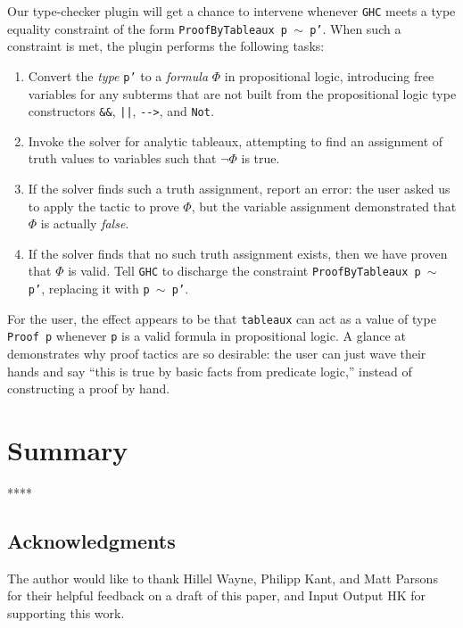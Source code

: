 \documentclass[format=sigplan, review=false, screen=true]{acmart}
\begin{document}
Our type-checker plugin will get a chance to intervene whenever \texttt{GHC}
meets a type equality constraint of the form \texttt{ProofByTableaux p $\sim$ p'}.
When such a constraint is met, the plugin performs the following tasks:
\begin{enumerate}
\item Convert the \emph{type} \texttt{p'} to a \emph{formula} $\Phi$ in propositional
  logic, introducing free variables for any subterms that are not built from the
  propositional logic type constructors \verb|&&|, \verb#||#, \verb|-->|, and \verb|Not|.
\item Invoke the solver for analytic tableaux, attempting to find an assignment of truth
  values to variables such that $\neg \Phi$ is true.
\item If the solver finds such a truth assignment, report an error: the user asked us
  to apply the tactic to prove $\Phi$, but the variable assignment demonstrated that
  $\Phi$ is actually \emph{false}.
\item If the solver finds that no such truth assignment exists, then we have proven that
  $\Phi$ is valid. Tell \texttt{GHC} to discharge the constraint \texttt{ProofByTableaux p $\sim$ p'}, replacing it with \texttt{p $\sim$ p'}.
\end{enumerate}
For the user, the effect appears to be that \texttt{tableaux} can act as a value of
type \texttt{Proof p} whenever \texttt{p} is a valid formula in propositional logic.
A glance at  demonstrates why proof tactics are so desirable:
the user can just wave their hands and say ``this is true by basic facts from predicate logic,''
instead of constructing a proof by hand.

\section*{Summary}
****

\subsection*{Acknowledgments}
The author would like to thank Hillel Wayne, Philipp Kant, and Matt Parsons for
their helpful feedback on a draft of this paper, and Input Output HK for supporting
this work.




\end{document}
